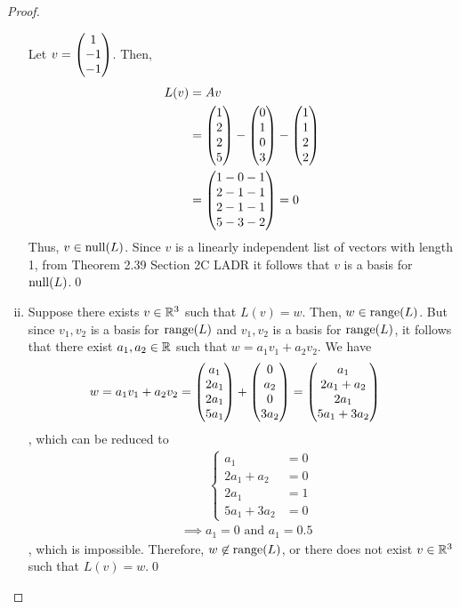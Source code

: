 \begin{proof}
\begin{enumerate}[(i)]
        Let $v=\begin{pmatrix} 1\\ -1\\ -1\end{pmatrix}$. Then,  
        \[
            \begin{aligned}
                L(v)
                &= Av\\
                &= \begin{pmatrix} 1\\ 2\\2 \\ 5\end{pmatrix}-\begin{pmatrix} 0\\ 1\\0 \\ 3\end{pmatrix}-\begin{pmatrix} 1\\ 1\\2 \\ 2\end{pmatrix}\\
                &= \begin{pmatrix} 1-0-1\\ 2-1-1\\2-1-1 \\ 5-3-2\end{pmatrix}=0
            \end{aligned}
        \]
        Thus, $v\in\textnormal{null}(L)$.
        Since $v$ is a linearly independent list of vectors with length 1, from Theorem 2.39 Section 2C LADR it follows that $v$ is a basis for $\textnormal{null}(L)$.\qed
        \item 
        Suppose there exists $v\in\mathbb R^3$ such that $L(v)=w$.
        Then, $w\in\textnormal{range}(L)$.
        But since $v_1,v_2$ is a basis for $\textnormal{range}(L)$ and $v_1,v_2$ is a basis for $\textnormal{range}(L)$, it follows that there exist $a_1,a_2\in\mathbb R$ such that $w=a_1v_1+a_2v_2$.
        We have 
        \[
            \begin{aligned}
                w
                = a_1v_1+a_2v_2
                = \begin{pmatrix} a_1\\ 2a_1\\2a_1 \\ 5a_1\end{pmatrix}+\begin{pmatrix} 0\\ a_2\\0 \\ 3a_2\end{pmatrix} &= \begin{pmatrix} a_1\\ 2a_1+a_2\\2a_1 \\ 5a_1+3a_2\end{pmatrix}
            \end{aligned}
        \]
        , which can be reduced to 
        \begin{align*}
            &\qquad \ \begin{cases}
                a_1 &= 0\\
                2a_1+a_2 &= 0\\
                2a_1 &= 1\\
                5a_1+3a_2 &= 0
            \end{cases}\\
            &\implies a_1=0\text{ and } a_1=0.5
        \end{align*}
        , which is impossible.
        Therefore, $w\not\in\textnormal{range}(L)$, or there does not exist $v\in\mathbb R^3$ such that $L(v)=w$.\qed
    \end{enumerate}
    \renewcommand{\qedsymbol}{}
\end{proof}